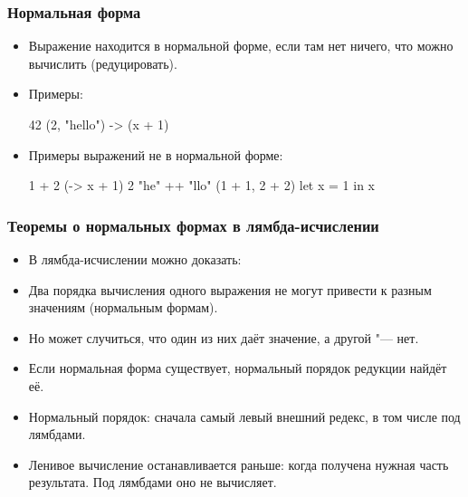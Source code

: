 \documentclass[11pt]{beamer}
\begin{document}
\begin{frame}[fragile]
  \frametitle{Нормальная форма}
  \begin{itemize}
    \item Выражение находится в нормальной форме, если там нет ничего, что можно вычислить (редуцировать).
    \item Примеры: \pause
          \begin{haskell}
            42
            (2, "hello")
            \x -> (x + 1)
          \end{haskell}
    \item Примеры выражений не в нормальной форме: \pause
          \begin{haskell}
            1 + 2                 
            (\x -> x + 1) 2       
            "he" ++ "llo"         
            (1 + 1, 2 + 2)
            let x = 1 in x
          \end{haskell}
  \end{itemize}
\end{frame}

\begin{frame}[fragile]
  \frametitle{Теоремы о нормальных формах в лямбда-исчислении}
  \begin{itemize}
    \item В лямбда-исчислении можно доказать:
    \item Два порядка вычисления одного выражения не могут привести к разным значениям (нормальным формам).
    \item Но может случиться, что один из них даёт значение, а другой "--- нет.
    \item Если нормальная форма существует, нормальный порядок редукции найдёт её.
    \item Нормальный порядок: сначала самый левый внешний редекс, в том числе под лямбдами.
    \item Ленивое вычисление останавливается раньше: когда получена нужная часть результата. Под лямбдами оно не вычисляет.
  \end{itemize}
\end{frame}
\end{document}
